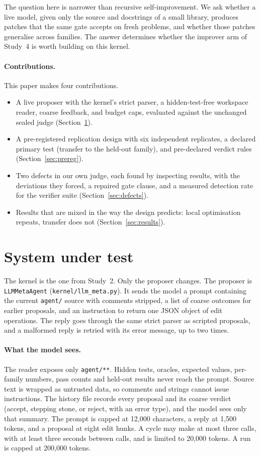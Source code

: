\documentclass[11pt]{article}
\begin{document}
The question here is narrower than recursive self-improvement. We ask whether a live model, given only the source and docstrings of a small library, produces patches that the same gate accepts on fresh problems, and whether those patches generalise across families.
The answer determines whether the improver arm of Study~4 is worth building on this kernel.

\paragraph{Contributions.} This paper makes four contributions.
\begin{itemize}\setlength\itemsep{1pt}
\item A live proposer with the kernel's strict parser, a hidden-test-free workspace reader, coarse feedback, and budget caps, evaluated against the unchanged sealed judge (Section~\ref{sec:system}).
\item A pre-registered replication design with six independent replicates, a declared primary test (transfer to the held-out family), and pre-declared verdict rules (Section~\ref{sec:prereg}).
\item Two defects in our own judge, each found by inspecting results, with the deviations they forced, a repaired gate clause, and a measured detection rate for the verifier suite (Section~\ref{sec:defects}).
\item Results that are mixed in the way the design predicts: local optimisation repeats, transfer does not (Section~\ref{sec:results}).
\end{itemize}

\section{System under test}
\label{sec:system}

The kernel is the one from Study~2. Only the proposer changes. The proposer is \texttt{LLMMetaAgent} (\texttt{kernel/llm\_meta.py}). It sends the model a prompt containing the current \texttt{agent/} source with comments stripped, a list of coarse outcomes for earlier proposals, and an instruction to return one JSON object of edit operations. The reply goes through the same strict parser as scripted proposals, and a malformed reply is retried with its error message, up to two times.

\paragraph{What the model sees.} The reader exposes only \texttt{agent/**}. Hidden tests, oracles, expected values, per-family numbers, pass counts and held-out results never reach the prompt. Source text is wrapped as untrusted data, so comments and strings cannot issue instructions. The history file records every proposal and its coarse verdict (accept, stepping stone, or reject, with an error type), and the model sees only that summary.
The prompt is capped at 12,000 characters, a reply at 1,500 tokens, and a proposal at eight edit hunks. A cycle may make at most three calls, with at least three seconds between calls, and is limited to 20,000 tokens. A run is capped at 200,000 tokens.
\end{document}
